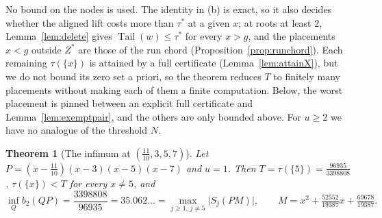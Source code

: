\documentclass[11pt]{article}
\newtheorem{theorem}{Theorem}[section]
\theoremstyle{definition}
\theoremstyle{plain}
\DeclareMathOperator{\Tail}{Tail}
\begin{document}
No bound on the nodes is used.  The identity in (b) is exact, so it also
decides whether the aligned lift costs more than $\tau^*$ at a given $x$;
at roots at least $2$, Lemma~\ref{lem:delete} gives $\Tail(w)\le\tau^*$ for
every $x>g$, and the placements $x<g$ outside $Z^*$ are those of the run
chord (Proposition~\ref{prop:runchord}).  Each remaining $\tau(\{x\})$ is
attained by a full certificate (Lemma~\ref{lem:attainX}), but we do not
bound its zero set a priori, so the theorem reduces $T$ to finitely many
placements without making each of them a finite computation.  Below, the
worst placement is pinned between an explicit full certificate and
Lemma~\ref{lem:exemptpair}, and the others are only bounded above.  For
$u\ge2$ we have no analogue of the threshold $N$.

\begin{theorem}[The infimum at $(\tfrac{11}{10},3,5,7)$]\label{thm:elevenvalue}
Let $P=(x-\tfrac{11}{10})(x-3)(x-5)(x-7)$ and $u=1$.  Then
$T=\tau(\{5\})=\tfrac{96935}{3398808}$, $\tau(\{x\})<T$ for every $x\ne5$,
and
\[
  \inf_Qb_2(QP)=\frac{3398808}{96935}=35.062\ldots
  =\max_{j\ge1,\,j\ne5}\bigl|S_j(PM)\bigr|,\qquad
  M=x^2+\tfrac{52552}{19387}x+\tfrac{69678}{19387}.
\]
\end{theorem}
\end{document}
